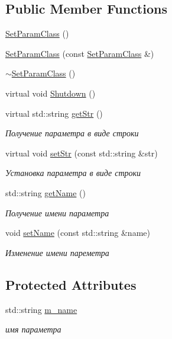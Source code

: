 \subsection*{Public Member Functions}
\begin{DoxyCompactItemize}
\item 
\hyperlink{class_set_param_class_ad828a552aff0bc52d291ae937fd0a09e}{Set\+Param\+Class} ()
\item 
\hyperlink{class_set_param_class_a1141cad641e64fb6d6c26ea6b31e3e71}{Set\+Param\+Class} (const \hyperlink{class_set_param_class}{Set\+Param\+Class} \&)
\item 
\hyperlink{class_set_param_class_a688cd798a44f22386635debf845333df}{$\sim$\+Set\+Param\+Class} ()
\item 
virtual void \hyperlink{class_set_param_class_afdb63374ca8c32f6678ba34e050e9071}{Shutdown} ()
\item 
virtual std\+::string \hyperlink{class_set_param_class_a44f3924827807beb6805867a0305e8c9}{get\+Str} ()
\begin{DoxyCompactList}\small\item\em Получение параметра в виде строки \end{DoxyCompactList}\item 
virtual void \hyperlink{class_set_param_class_aabba4e8a9b148582f40486e662408bf9}{set\+Str} (const std\+::string \&str)
\begin{DoxyCompactList}\small\item\em Установка параметра в виде строки \end{DoxyCompactList}\item 
std\+::string \hyperlink{class_set_param_class_a6c14fce9f4a896f6470888f3cacfb025}{get\+Name} ()
\begin{DoxyCompactList}\small\item\em Получение имени параметра \end{DoxyCompactList}\item 
void \hyperlink{class_set_param_class_aeabf85ad5a078ab4abb8f09a67f2c8e0}{set\+Name} (const std\+::string \&name)
\begin{DoxyCompactList}\small\item\em Изменение имени пареметра \end{DoxyCompactList}\end{DoxyCompactItemize}
\subsection*{Protected Attributes}
\begin{DoxyCompactItemize}
\item 
std\+::string \hyperlink{class_set_param_class_aab204889210304af482b414a6f8dbe82}{m\+\_\+name}
\begin{DoxyCompactList}\small\item\em имя параметра \end{DoxyCompactList}\end{DoxyCompactItemize}


